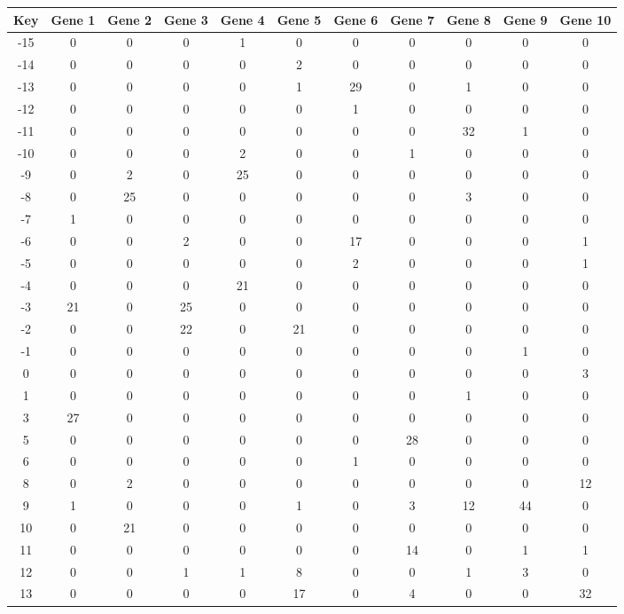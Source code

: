 \begin{tabular}{|c|c|c|c|c|c|c|c|c|c|c|}
\hline
Key & Gene 1 & Gene 2 & Gene 3 & Gene 4 & Gene 5 & Gene 6 & Gene 7 & Gene 8 & Gene 9 & Gene 10 \\
\hline
-15 & 0 & 0 & 0 & 1 & 0 & 0 & 0 & 0 & 0 & 0 \\
-14 & 0 & 0 & 0 & 0 & 2 & 0 & 0 & 0 & 0 & 0 \\
-13 & 0 & 0 & 0 & 0 & 1 & 29 & 0 & 1 & 0 & 0 \\
-12 & 0 & 0 & 0 & 0 & 0 & 1 & 0 & 0 & 0 & 0 \\
-11 & 0 & 0 & 0 & 0 & 0 & 0 & 0 & 32 & 1 & 0 \\
-10 & 0 & 0 & 0 & 2 & 0 & 0 & 1 & 0 & 0 & 0 \\
-9 & 0 & 2 & 0 & 25 & 0 & 0 & 0 & 0 & 0 & 0 \\
-8 & 0 & 25 & 0 & 0 & 0 & 0 & 0 & 3 & 0 & 0 \\
-7 & 1 & 0 & 0 & 0 & 0 & 0 & 0 & 0 & 0 & 0 \\
-6 & 0 & 0 & 2 & 0 & 0 & 17 & 0 & 0 & 0 & 1 \\
-5 & 0 & 0 & 0 & 0 & 0 & 2 & 0 & 0 & 0 & 1 \\
-4 & 0 & 0 & 0 & 21 & 0 & 0 & 0 & 0 & 0 & 0 \\
-3 & 21 & 0 & 25 & 0 & 0 & 0 & 0 & 0 & 0 & 0 \\
-2 & 0 & 0 & 22 & 0 & 21 & 0 & 0 & 0 & 0 & 0 \\
-1 & 0 & 0 & 0 & 0 & 0 & 0 & 0 & 0 & 1 & 0 \\
0 & 0 & 0 & 0 & 0 & 0 & 0 & 0 & 0 & 0 & 3 \\
1 & 0 & 0 & 0 & 0 & 0 & 0 & 0 & 1 & 0 & 0 \\
3 & 27 & 0 & 0 & 0 & 0 & 0 & 0 & 0 & 0 & 0 \\
5 & 0 & 0 & 0 & 0 & 0 & 0 & 28 & 0 & 0 & 0 \\
6 & 0 & 0 & 0 & 0 & 0 & 1 & 0 & 0 & 0 & 0 \\
8 & 0 & 2 & 0 & 0 & 0 & 0 & 0 & 0 & 0 & 12 \\
9 & 1 & 0 & 0 & 0 & 1 & 0 & 3 & 12 & 44 & 0 \\
10 & 0 & 21 & 0 & 0 & 0 & 0 & 0 & 0 & 0 & 0 \\
11 & 0 & 0 & 0 & 0 & 0 & 0 & 14 & 0 & 1 & 1 \\
12 & 0 & 0 & 1 & 1 & 8 & 0 & 0 & 1 & 3 & 0 \\
13 & 0 & 0 & 0 & 0 & 17 & 0 & 4 & 0 & 0 & 32 \\
\hline
\end{tabular}